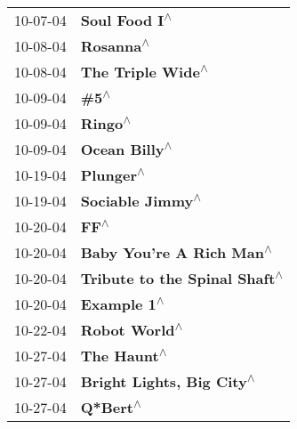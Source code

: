 \begin{supertabular}{p{0.25\columnwidth}p{0.75\columnwidth}}
 10-07-04 &                                                              \textbf{Soul Food I\textsuperscript{$\wedge$}} \\
 10-08-04 &                                                                  \textbf{Rosanna\textsuperscript{$\wedge$}} \\
 10-08-04 &                                                          \textbf{The Triple Wide\textsuperscript{$\wedge$}} \\
 10-09-04 &                                                                      \textbf{\#5\textsuperscript{$\wedge$}} \\
 10-09-04 &                                                                    \textbf{Ringo\textsuperscript{$\wedge$}} \\
 10-09-04 &                                                              \textbf{Ocean Billy\textsuperscript{$\wedge$}} \\
 10-19-04 &                                                                  \textbf{Plunger\textsuperscript{$\wedge$}} \\
 10-19-04 &                                                           \textbf{Sociable Jimmy\textsuperscript{$\wedge$}} \\
 10-20-04 &                                                                       \textbf{FF\textsuperscript{$\wedge$}} \\
 10-20-04 &                                                   \textbf{Baby You're A Rich Man\textsuperscript{$\wedge$}} \\
 10-20-04 &                                              \textbf{Tribute to the Spinal Shaft\textsuperscript{$\wedge$}} \\
 10-20-04 &                                                                \textbf{Example 1\textsuperscript{$\wedge$}} \\
 10-22-04 &                                                              \textbf{Robot World\textsuperscript{$\wedge$}} \\
 10-27-04 &                                                                \textbf{The Haunt\textsuperscript{$\wedge$}} \\
 10-27-04 &                                                  \textbf{Bright Lights, Big City\textsuperscript{$\wedge$}} \\
 10-27-04 &                                                                   \textbf{Q*Bert\textsuperscript{$\wedge$}} \\

\end{supertabular}
